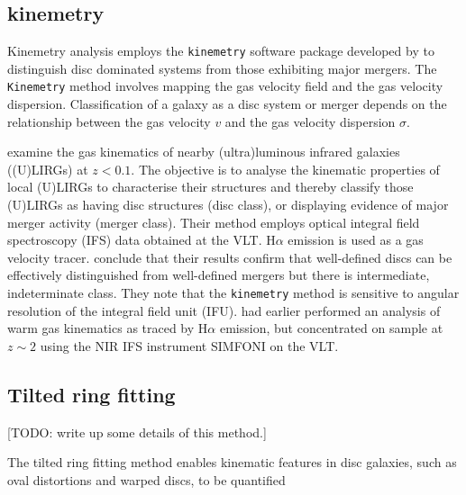 
\subsection{kinemetry}
Kinemetry analysis employs the \texttt{kinemetry} software package developed by \citet{2006MNRAS.366..787K} to distinguish disc dominated systems from those exhibiting major mergers. The \texttt{Kinemetry} method involves mapping the gas velocity field and the gas velocity dispersion. Classification of a galaxy as a disc system or merger depends on the relationship between the gas velocity $v$ and the gas velocity dispersion $\sigma$.

\citet{2016A&A...591A..85B} examine the gas kinematics of nearby (ultra)luminous infrared galaxies ((U)LIRGs) at $z<0.1$. The objective is to analyse the kinematic properties of local (U)LIRGs to characterise their structures and thereby classify those (U)LIRGs as having disc structures (disc class), or displaying evidence of major merger activity (merger class). Their method employs optical integral field spectroscopy (IFS) data obtained at the VLT. H$\alpha$ emission is used as a gas velocity tracer. \citet{2016A&A...591A..85B} conclude that their results confirm that well-defined discs can be effectively distinguished from well-defined mergers but there is intermediate, indeterminate class. They note that the \texttt{kinemetry} method is sensitive to angular resolution of the integral field unit (IFU). \citet{2008ApJ...682..231S} had earlier performed an  analysis of warm gas kinematics as traced by H$\alpha$ emission, but concentrated on sample at $z\sim2$ using the NIR IFS instrument SIMFONI on the VLT. 

\subsection{Tilted ring fitting}
\label{sec:tilted-ring-fitting}

[TODO: write up some details of this method.]

The tilted ring fitting method enables kinematic features in disc galaxies, such as oval distortions and warped discs, to be quantified  \citep[see e.g.][]{1978PhDT.......195B,1981AJ.....86.1825B,2007A&A...468..731J}
